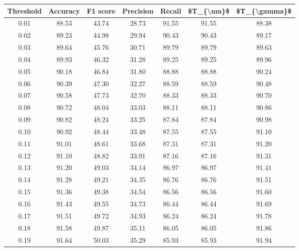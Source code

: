 \begin{tabular}{|c|c|c|c|c|c|c|}
\hline
 Threshold &  Accuracy &  F1 score &  Precision &  Recall &  \$T\_\{\textbackslash mu\}\$ &  \$T\_\{\textbackslash gamma\}\$ \\
\hline
      0.01 &     88.53 &     43.74 &      28.73 &   91.55 &      91.55 &         88.38 \\
      0.02 &     89.23 &     44.98 &      29.94 &   90.43 &      90.43 &         89.17 \\
      0.03 &     89.64 &     45.76 &      30.71 &   89.79 &      89.79 &         89.63 \\
      0.04 &     89.93 &     46.32 &      31.28 &   89.25 &      89.25 &         89.96 \\
      0.05 &     90.18 &     46.84 &      31.80 &   88.88 &      88.88 &         90.24 \\
      0.06 &     90.39 &     47.30 &      32.27 &   88.59 &      88.59 &         90.48 \\
      0.07 &     90.58 &     47.73 &      32.70 &   88.33 &      88.33 &         90.70 \\
      0.08 &     90.72 &     48.04 &      33.03 &   88.11 &      88.11 &         90.86 \\
      0.09 &     90.82 &     48.24 &      33.25 &   87.84 &      87.84 &         90.98 \\
      0.10 &     90.92 &     48.44 &      33.48 &   87.55 &      87.55 &         91.10 \\
      0.11 &     91.01 &     48.61 &      33.68 &   87.31 &      87.31 &         91.20 \\
      0.12 &     91.10 &     48.82 &      33.91 &   87.16 &      87.16 &         91.31 \\
      0.13 &     91.20 &     49.03 &      34.14 &   86.97 &      86.97 &         91.41 \\
      0.14 &     91.28 &     49.21 &      34.35 &   86.76 &      86.76 &         91.51 \\
      0.15 &     91.36 &     49.38 &      34.54 &   86.56 &      86.56 &         91.60 \\
      0.16 &     91.43 &     49.55 &      34.73 &   86.44 &      86.44 &         91.69 \\
      0.17 &     91.51 &     49.72 &      34.93 &   86.24 &      86.24 &         91.78 \\
      0.18 &     91.58 &     49.87 &      35.11 &   86.05 &      86.05 &         91.86 \\
      0.19 &     91.64 &     50.03 &      35.29 &   85.93 &      85.93 &         91.94 \\

\end{tabular}
